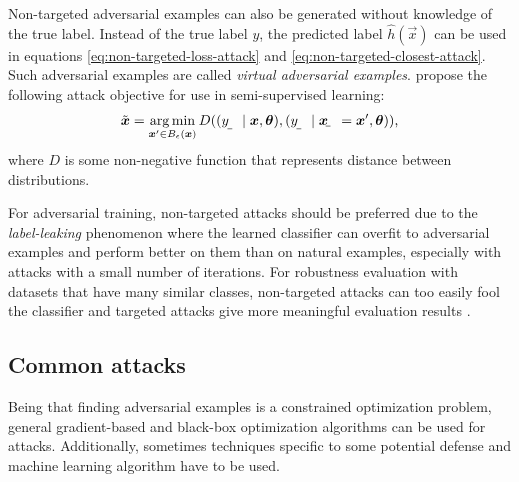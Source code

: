 \documentclass[conference,compsoc]{IEEEtran}
\begin{document}
Non-targeted adversarial examples can also be generated without knowledge of the true label. Instead of the true label $y$, the predicted label $\hat{h}(\vec x)$ can be used in equations \eqref{eq:non-targeted-loss-attack} and \eqref{eq:non-targeted-closest-attack}. Such adversarial examples are called \textit{virtual adversarial examples}.
\citet{Miyato:2017:VATRMSSSL,Kurakin:2016:AMLS} propose the following attack objective for use in semi-supervised learning:
\begin{align}
    \tilde{\vec x} = \argmin_{\vec x'\in B_\epsilon(\vec x)} D((\rvar y\mid \vec x, \vec\theta), (\rvar y\mid \rvec x = \vec x', \vec\theta)) \text{,}
\end{align}
where $D$ is some non-negative function that represents distance between distributions.

For adversarial training, non-targeted attacks should be preferred due to the \textit{label-leaking} phenomenon \citep{Kurakin:2016:AMLS} where the learned classifier can overfit to adversarial examples and perform better on them than on natural examples, especially with attacks with a small number of iterations. For robustness evaluation with datasets that have many similar classes, non-targeted attacks can too easily fool the classifier and targeted attacks give more meaningful evaluation results \citep{Athalye:2018:OGGFSS}.

\subsection{Common attacks}

Being that finding adversarial examples is a constrained optimization problem, general gradient-based and black-box optimization algorithms can be used for attacks. Additionally, sometimes techniques specific to some potential defense and machine learning algorithm have to be used.
\end{document}
